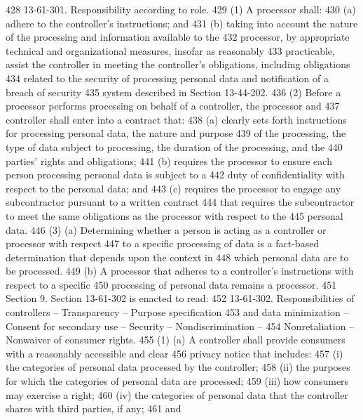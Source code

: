 428          13-61-301. Responsibility according to role.
429          (1) A processor shall:
430          (a) adhere to the controller's instructions; and
431          (b) taking into account the nature of the processing and information available to the
432     processor, by appropriate technical and organizational measures, insofar as reasonably
433     practicable, assist the controller in meeting the controller's obligations, including obligations
434     related to the security of processing personal data and notification of a breach of security
435     system described in Section 13-44-202.
436          (2) Before a processor performs processing on behalf of a controller, the processor and
437     controller shall enter into a contract that:
438          (a) clearly sets forth instructions for processing personal data, the nature and purpose
439     of the processing, the type of data subject to processing, the duration of the processing, and the
440     parties' rights and obligations;
441          (b) requires the processor to ensure each person processing personal data is subject to a
442     duty of confidentiality with respect to the personal data; and
443          (c) requires the processor to engage any subcontractor pursuant to a written contract
444     that requires the subcontractor to meet the same obligations as the processor with respect to the
445     personal data.
446          (3) (a) Determining whether a person is acting as a controller or processor with respect
447     to a specific processing of data is a fact-based determination that depends upon the context in
448     which personal data are to be processed.
449          (b) A processor that adheres to a controller's instructions with respect to a specific
450     processing of personal data remains a processor.
451          Section 9. Section 13-61-302 is enacted to read:
452          13-61-302. Responsibilities of controllers -- Transparency -- Purpose specification
453     and data minimization -- Consent for secondary use -- Security -- Nondiscrimination --
454     Nonretaliation -- Nonwaiver of consumer rights.
455          (1) (a) A controller shall provide consumers with a reasonably accessible and clear
456     privacy notice that includes:
457          (i) the categories of personal data processed by the controller;
458          (ii) the purposes for which the categories of personal data are processed;
459          (iii) how consumers may exercise a right;
460          (iv) the categories of personal data that the controller shares with third parties, if any;
461     and
